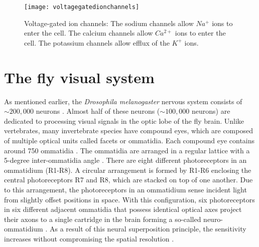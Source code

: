 \begin{figure}
\centering
\hspace*{-1cm} 
\texttt{[image: voltagegatedionchannels]}
\caption[Voltage-gated ion channels] {Voltage-gated ion channels: The sodium channels allow $Na^{+}$ ions to enter the cell. The calcium channels allow $Ca^{2+}$ ions to enter the cell. The potassium channels allow efflux of the $K^{+}$ ions.}
\label{fig:vgatedionc}
\end{figure}


\section{The fly visual system}

As mentioned earlier, the \textit{Drosophila melanogaster} nervous system consists of ${\sim}200,000$ neurons \parencite{Raji2021}. Almost half of these neurons (${\sim}100,000$ neurons) are dedicated to processing visual signals in the optic lobe of the fly brain. Unlike vertebrates, many invertebrate species have compound eyes, which are composed of multiple optical units called facets or ommatidia. Each compound eye contains around 750 ommatidia \parencite{Ready1976}. The ommatidia are arranged in a regular lattice with a 5-degree inter-ommatidia angle \parencite{Land1997}. There are eight different photoreceptors in an ommatidium (R1-R8). A circular arrangement is formed by R1-R6 enclosing the central photoreceptors R7 and R8, which are stacked on top of one another. Due to this arrangement, the photoreceptors in an ommatidium sense incident light from slightly offset positions in space. With this configuration, six photoreceptors in six different adjacent ommatidia that possess identical optical axes project their axons to a single cartridge in the brain forming a so-called neuro-ommatidium \parencite{Strausfeld1971}. As a result of this neural superposition principle, the sensitivity increases without compromising the spatial resolution \parencite{Kirschfeld1967}.

